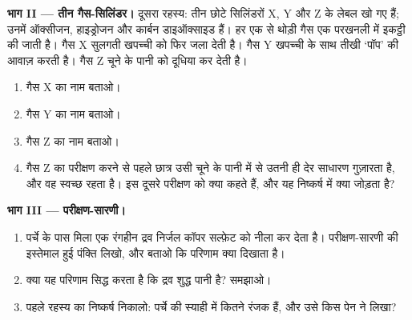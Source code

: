 \begin{problem}[{सप्ताहांत समस्या --- फ़ेल्ट-पेन से लिखा एक पर्चा, तीन संदिग्ध पेन,
तीन बिना लेबल के गैस-सिलिंडर, और एक परीक्षण-सारणी}]
\medskip
\noindent\textbf{भाग II --- तीन गैस-सिलिंडर।}
दूसरा रहस्य: तीन छोटे सिलिंडरों X, Y और Z के लेबल खो गए हैं; उनमें
ऑक्सीजन, हाइड्रोजन और कार्बन डाइऑक्साइड हैं। हर एक से थोड़ी गैस एक परखनली
में इकट्ठी की जाती है। गैस X सुलगती खपच्ची को फिर जला देती है। गैस Y 
खपच्ची के साथ तीखी `पॉप' की आवाज़ करती है। गैस Z चूने के पानी को दूधिया कर देती है।
\begin{enumerate}[resume]
  \item गैस X का नाम बताओ।
  \item गैस Y का नाम बताओ।
  \item गैस Z का नाम बताओ।
  \item गैस Z का परीक्षण करने से पहले छात्र उसी चूने के पानी में से उतनी ही
        देर साधारण  गुज़ारता है, और वह स्वच्छ रहता है। इस दूसरे परीक्षण
        को क्या कहते हैं, और यह निष्कर्ष में क्या जोड़ता है?
\end{enumerate}

\medskip
\noindent\textbf{भाग III --- परीक्षण-सारणी।}
\begin{enumerate}[resume]
  \item पर्चे के पास मिला एक रंगहीन द्रव निर्जल कॉपर सल्फ़ेट को नीला कर देता
        है। परीक्षण-सारणी की इस्तेमाल हुई पंक्ति लिखो, और बताओ कि परिणाम
        क्या दिखाता है।
  \item क्या यह परिणाम सिद्ध करता है कि द्रव शुद्ध पानी है? समझाओ।
  \item पहले रहस्य का निष्कर्ष निकालो: पर्चे की स्याही में कितने रंजक हैं,
        और उसे किस पेन ने लिखा?
\end{enumerate}
\end{problem}

